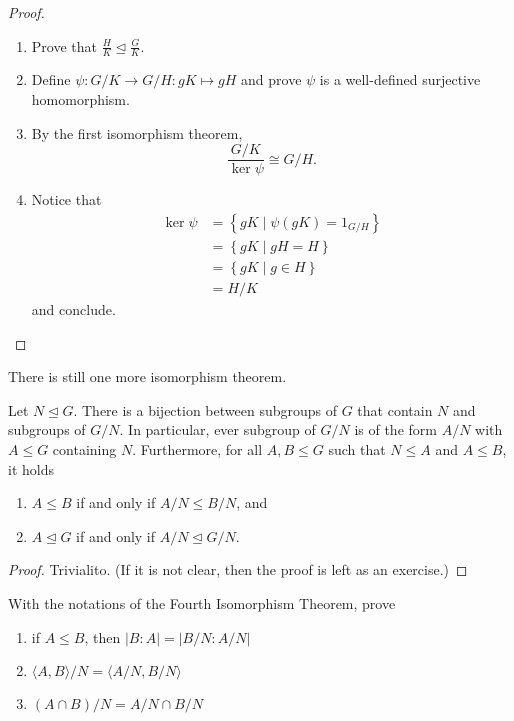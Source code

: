 \documentclass[11pt,a4paper]{article}
\begin{document}
\begin{proof}
\begin{enumerate}[label=(\roman*)]
    \item Prove that \(\frac{H}{K}  \unlhd \frac{G}{K}\).
    \item Define \(\psi\colon G/K \to G/H: gK \mapsto gH\) and prove \(\psi\) is a well-defined surjective homomorphism.
    \item By the first isomorphism theorem, \[\frac{G/K}{\ker \psi}\cong G/H.\]
    \item Notice that 
    \begin{align*}
        \ker \psi &= \left\{ gK \mid \psi (gK) = 1_{G/H} \right\}\\
        &= \left\{ gK \mid g H = H \right\}\\
        &= \left\{ gK \mid g\in H \right\}\\
        &= H / K    
    \end{align*}
    and conclude.
\end{enumerate}
\end{proof}

There is still one more isomorphism theorem.

\begin{cor}
Let  \(N\unlhd G\).
There is a bijection between subgroups of \(G\) that contain \(N\) and subgroups of \(G/N\).
In particular, ever subgroup of \(G/N\) is of the form \(A/N\) with \(A\leq G\) containing \(N\).
Furthermore, for all \(A,B\leq G\) such that \(N\leq A\) and \(A\leq B\), it holds
\begin{enumerate}[label=(\roman*)]
    \item \(A\leq B\) if and only if \(A/N \leq B/N\), and 
    \item \(A\unlhd G\) if and only if \(A/N\unlhd G/N\).
\end{enumerate}
\end{cor}

\begin{proof}
    Trivialito. (If it is not clear, then the proof is left as  an exercise.)
\end{proof}

\begin{eje}
With the notations of the Fourth Isomorphism Theorem, prove 
\begin{enumerate}[label=(\roman*)]
    \item if \(A\leq B\), then \(|B:A| = |B/N : A/ N|\)
    \item \({\langle A,B  \rangle} / N = \langle A/N, B/N \rangle \)
    \item \(({A\cap B})/N = A / N \cap B/ N\)
\end{enumerate}
\end{eje}
\end{document}
